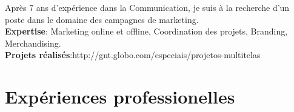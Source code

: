 \documentclass[11pt,a4paper,sans]{moderncv}        %
\begin{document}
\makecvtitle 
\vspace{-20pt}
Après 7 ans d'expérience dans la Communication, je suis à la recherche d'un poste dans le domaine des campagnes de marketing.\\
{ \textbf{Expertise}: Marketing online et offline, Coordination des projets, Branding, Merchandising.\\
\textbf{Projets réalisés}:http://gnt.globo.com/especiais/projetos-multitelas}

\section{Expériences professionelles}

\vspace{4pt}
\end{document}

